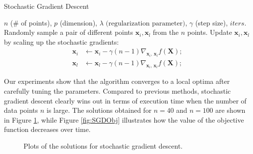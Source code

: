 \documentclass[11pt]{article}
\begin{document}
\begin{algorithm}
  \caption{Stochastic Gradient Descent}
  \label{alg1}
  \begin{algorithmic}\label{alg:SGD}
  \REQUIRE $n$ (\# of points), $p$ (dimension), $\lambda \text{ (regularization parameter)}$, $\gamma$ (step size), $iters$.
  \STATE Randomly sample a pair of different points $\bm{x}_i,\bm{x}_l$ from the $n$ points.
  \STATE Update $\bm{x}_i,\bm{x}_l$ by scaling up the stochastic gradients:
    \begin{align*}
    \bm{x}_i & \leftarrow \bm{x}_i - \gamma (n-1) \nabla_{\bm{x}_i,\,\bm{x}_l} f(\bm{X}); \\
    \bm{x}_l & \leftarrow \bm{x}_l - \gamma (n-1) \nabla_{\bm{x}_i,\,\bm{x}_l} f(\bm{X});
    \end{align*}
\ENDFOR
 \end{algorithmic}
\end{algorithm}

Our experiments show that the algorithm converges to a local optima after carefully tuning the parameters. Compared to previous methods, stochastic gradient descent clearly wins out in terms of execution time when the number of data points $n$ is large. The solutions obtained for $n=40$ and $n=100$ are shown in Figure \ref{fig:SGDPoints}, while Figure \ref{fig:SGDObj} illustrates how the value of the objective function decreases over time.

 
\begin{figure}[ht]
  \centering
  \caption{Plots of the solutions for stochastic gradient descent.}
  \label{fig:SGDPoints}
\end{figure}
\end{document}
